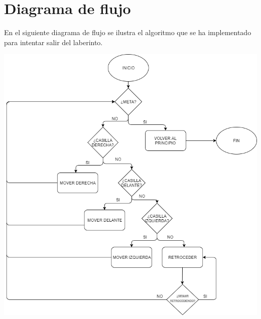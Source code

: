 \section{Diagrama de flujo}
En el siguiente diagrama de flujo se ilustra el algoritmo que se ha implementado para intentar salir del laberinto.\\

\begin{center}
	\includegraphics[scale=0.65]{DiagramaFlujo.png}
\end{center}
